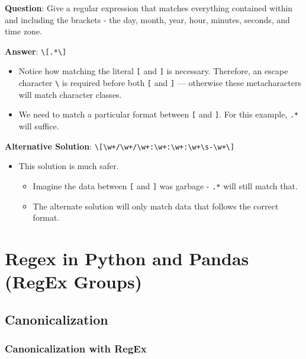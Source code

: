 \documentclass[
  letterpaper,
  DIV=11,
  numbers=noendperiod]{scrreprt}
\providecommand{\tightlist}{%
  \setlength{\itemsep}{0pt}\setlength{\parskip}{0pt}}\usepackage{longtable,booktabs,array}
\begin{document}
\textbf{Question}: Give a regular expression that matches everything
contained within and including the brackets - the day, month, year,
hour, minutes, seconds, and time zone.

\textbf{Answer}: \texttt{\textbackslash{}{[}.*\textbackslash{}{]}}

\begin{itemize}
\tightlist
\item
  Notice how matching the literal \texttt{{[}} and \texttt{{]}} is
  necessary. Therefore, an escape character \texttt{\textbackslash{}} is
  required before both \texttt{{[}} and \texttt{{]}} --- otherwise these
  metacharacters will match character classes.
\item
  We need to match a particular format between \texttt{{[}} and
  \texttt{{]}}. For this example, \texttt{.*} will suffice.
\end{itemize}

\textbf{Alternative Solution}:
\texttt{\textbackslash{}{[}\textbackslash{}w+/\textbackslash{}w+/\textbackslash{}w+:\textbackslash{}w+:\textbackslash{}w+:\textbackslash{}w+\textbackslash{}s-\textbackslash{}w+\textbackslash{}{]}}

\begin{itemize}
\tightlist
\item
  This solution is much safer.

  \begin{itemize}
  \tightlist
  \item
    Imagine the data between \texttt{{[}} and \texttt{{]}} was garbage -
    \texttt{.*} will still match that.
  \item
    The alternate solution will only match data that follows the correct
    format.
  \end{itemize}
\end{itemize}

\section{Regex in Python and Pandas (RegEx
Groups)}\label{regex-in-python-and-pandas-regex-groups}

\subsection{Canonicalization}\label{canonicalization-1}

\subsubsection{Canonicalization with
RegEx}\label{canonicalization-with-regex}
\end{document}

